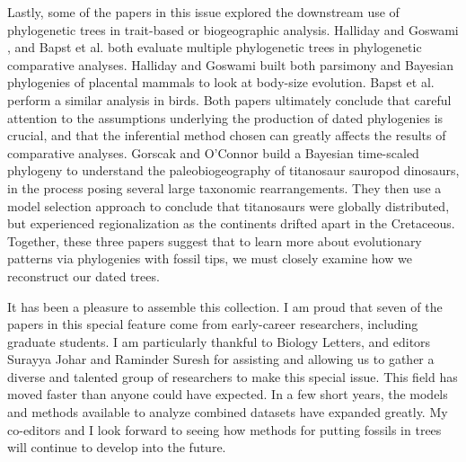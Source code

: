 \documentclass[]{article}
\begin{document}
Lastly, some of the papers in this issue explored the downstream use of phylogenetic trees in trait-based or biogeographic analysis. Halliday and Goswami \cite{halliday2016impact}, and Bapst et al. \cite{bapst2016topology} both evaluate multiple phylogenetic trees in phylogenetic comparative analyses. Halliday and Goswami built both parsimony and Bayesian phylogenies of placental mammals to look at body-size evolution. Bapst et al. perform a similar analysis in birds. Both papers ultimately conclude that careful attention to the assumptions underlying the production of dated phylogenies is crucial, and that the inferential method chosen can greatly affects the results of comparative analyses. Gorscak and O'Connor \cite{gorscak2016time} build a Bayesian time-scaled phylogeny to understand the paleobiogeography of titanosaur sauropod dinosaurs, in the process posing several large taxonomic rearrangements. They then use a model selection approach to conclude that titanosaurs were globally distributed, but experienced regionalization as the continents drifted apart in the Cretaceous. Together, these three papers suggest that to learn more about evolutionary patterns via phylogenies with fossil tips, we must closely examine how we reconstruct our dated trees.\par

It has been a pleasure to assemble this collection. I am proud that seven of the papers in this special feature come from early-career researchers, including graduate students. I am particularly thankful to Biology Letters, and editors Surayya Johar and Raminder Suresh for assisting and allowing us to gather a diverse and talented group of researchers to make this special issue. This field has moved faster than anyone could have expected. In a few short years, the models and methods available to analyze combined datasets have expanded greatly. My co-editors and I look forward to seeing how methods for putting fossils in trees will continue to develop into the future.\par
 


\end{document}
